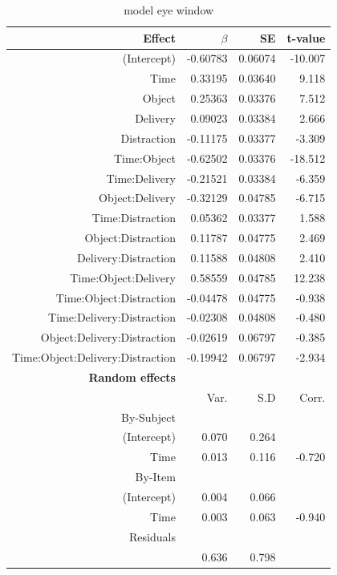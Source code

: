\documentclass[a4paper,man,natbib]{apa6}
\begin{document}
\begin{table}
\begin{tabular}{rrrr}
\hline
Effect & $\beta$ & SE & t-value\\
\hline
(Intercept) & -0.60783 & 0.06074 & -10.007\\
Time & 0.33195 & 0.03640 & 9.118\\
Object & 0.25363 & 0.03376 & 7.512\\
Delivery & 0.09023 & 0.03384 & 2.666\\
Distraction & -0.11175 & 0.03377 & -3.309\\
Time:Object & -0.62502 & 0.03376 & -18.512\\
Time:Delivery & -0.21521 & 0.03384 & -6.359\\
Object:Delivery & -0.32129 & 0.04785 & -6.715\\
Time:Distraction & 0.05362 & 0.03377 & 1.588\\
Object:Distraction & 0.11787 & 0.04775 & 2.469\\
Delivery:Distraction & 0.11588 & 0.04808 & 2.410\\
Time:Object:Delivery & 0.58559 & 0.04785 & 12.238\\
Time:Object:Distraction & -0.04478 & 0.04775 & -0.938\\
Time:Delivery:Distraction & -0.02308 & 0.04808 & -0.480\\
Object:Delivery:Distraction & -0.02619 & 0.06797 & -0.385\\
Time:Object:Delivery:Distraction & -0.19942 & 0.06797 & -2.934\\
\hline
\textbf{Random effects} & & & \\
& Var. & S.D & Corr. \\
By-Subject & & &\\
(Intercept) & 0.070 & 0.264 &\\
Time & 0.013 & 0.116 & -0.720 \\
By-Item & & &\\
(Intercept) & 0.004 & 0.066 &\\
Time & 0.003 & 0.063 & -0.940 \\
Residuals & & & \\
& 0.636 & 0.798 & \\
\hline
\end{tabular}
\caption{model eye window}
\label{table:modeleye}
\end{table}
\end{document}
